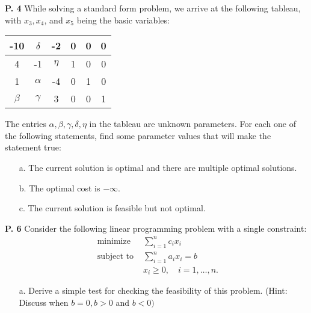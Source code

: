 \documentclass{article}
\begin{document}
\begin{jacklist}
\begin{center}
\begin{tabular}{|c|cccccccc|}
        \end{tabular}
    \end{center}
\newpage
    \begin{framed} 
    \item [\textbf{P. 4}] While solving a standard form problem, we arrive at the following tableau, with $x_{3}, x_{4}$, and $x_{5}$ 
        being the basic variables: 
        \begin{center}
        \begin{tabular}{|c|ccccc|}
            \hline-10 & $\delta$ & -2 & 0 & 0 & 0 \\
            \hline 4 & -1 & $\eta$ & 1 & 0 & 0 \\
            1 & $\alpha$ & -4 & 0 & 1 & 0 \\
            $\beta$ & $\gamma$ & 3 & 0 & 0 & 1 \\
            \hline
        \end{tabular}
        \end{center}
        The entries $\alpha, \beta, \gamma, \delta, \eta$ in the tableau are unknown parameters. 
        For each one of the following statements, find some parameter values that will make the statement true:
        \begin{itemize}
            \item [a.] The current solution is optimal and there are multiple optimal solutions.
            \item [b.] The optimal cost is $-\infty$.
            \item [c.] The current solution is feasible but not optimal.
        \end{itemize}
    \end{framed}
\newpage
    \begin{framed} 
    \item [\textbf{P. 6}] Consider the following linear programming problem with a single constraint: 
    \[ 
        \begin{aligned}
            \text { minimize } & \sum_{i=1}^{n} c_{i} x_{i} \\
            \text { subject to } & \sum_{i=1}^{n} a_{i} x_{i}=b \\
            & x_{i} \geq 0, \quad i=1, \ldots, n .
        \end{aligned}
    \] 
    \begin{itemize}
        \item [a.] Derive a simple test for checking the feasibility of this problem. (Hint: Discuss when $b=0, b>0$ and $b<0)$ 

\end{itemize}
\end{framed}
\end{jacklist}
\end{document}

